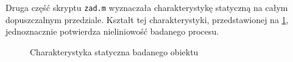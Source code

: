 Druga część skryptu \verb+zad.m+ wyznaczała charakterystykę statyczną na całym dopuszczalnym
przedziale. Kształt tej charakterystyki, przedstawionej na \ref{pro2_char_stat}, jednoznacznie
potwierdza nieliniowość badanego procesu.

\begin{figure}[b]
    \centering
    \caption{Charakterystyka statyczna badanego obiektu}
    \label{pro2_char_stat}
\end{figure}
